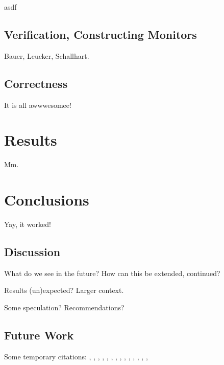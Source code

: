 \documentclass[a4paper,11pt]{kth-mag}
\begin{document}
asdf

\section{Verification, Constructing Monitors}

Bauer, Leucker, Schallhart.

\section{Correctness}

It is all awwwesomee!





\pagestyle{newchap}
\chapter{Results}

Mm.





\pagestyle{newchap}
\chapter{Conclusions}
Yay, it worked!


\section{Discussion}

What do we see in the future? How can this be extended, continued?

Results (un)expected? Larger context.

Some speculation? Recommendations?

\section{Future Work}


Some temporary citations:
\cite{hoare69}, \cite{floyd67}, \cite{pnueli77},
\cite{leucker09abriefaccount}, \cite{bauer06monitoring}, \cite{bauer08goodbadugly}, \cite{delgado04taxonomy}, \cite{meyer92applyingdbc},
\cite{rosenblum95practicalassertions}, \cite{bartetzko01jass},
\cite{bodden04lightweightltl}, \cite{bodden05efficientrv},
\cite{becksmalltalktesting}, \cite{fowlerxunit},
\cite{matusiak09aoppy}
\end{document}
